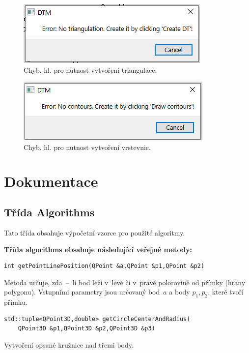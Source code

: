 \documentclass[a4paper, 12pt, oneside, titlepage]{article} %
\begin{document}
\begin{figure}[!htb]
	\centering
	\includegraphics[scale=0.7]{obrazky/no_dt.png} 
	\caption{Chyb. hl. pro nutnost vytvoření triangulace.
	}
	\label{fig:no_dt}
\end{figure} 
\FloatBarrier

\begin{figure}[!htb]
	\centering
	\includegraphics[scale=0.7]{obrazky/no_contours.png} 
	\caption{Chyb. hl. pro nutnost vytvoření vrstevnic.
	}
	\label{fig:no_contours}
\end{figure} 
\FloatBarrier



\section{Dokumentace}
\subsection{Třída Algorithms}
Tato třída obsahuje výpočetní vzorce pro použité algoritmy.

\textbf{Třída algorithms obsahuje následující veřejné metody:}

\begin{verbatim}
int getPointLinePosition(QPoint &a,QPoint &p1,QPoint &p2)
\end{verbatim}
Metoda určuje, zda~--~li bod leží v~levé či v~pravé polorovině od přímky (hrany polygonu). Vstupními parametry jsou určovaný bod~$a$ a body $p_1, p_2$, které tvoří přímku.\\

\begin{verbatim}
std::tuple<QPoint3D,double> getCircleCenterAndRadius(
    QPoint3D &p1,QPoint3D &p2,QPoint3D &p3)
\end{verbatim}
Vytvoření opsané kružnice nad třemi body.\\
\end{document}
